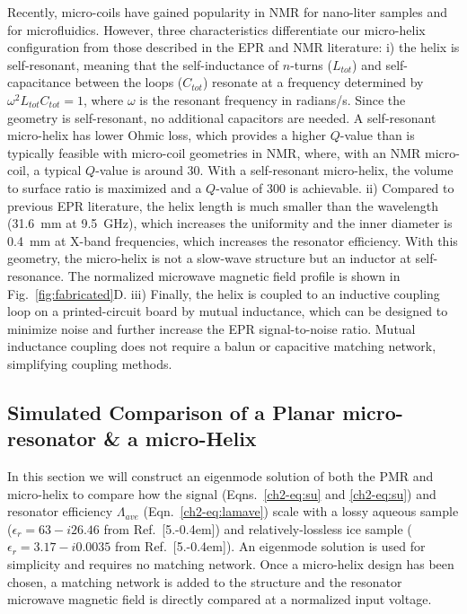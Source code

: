 Recently, micro-coils have gained popularity in NMR for nano-liter samples \cite{Olson1967, SUBRAMANIAN1998227, cr980140f,Kentgens2008,Raluca2011,Jones2012} and for microfluidics. \cite{Mompean2018} However, three characteristics differentiate our micro-helix configuration from those described in the EPR \cite{Webb1962, Helix1967, oldmicro} and NMR literature\cite{WEBB2005892}: i) the helix is self-resonant, meaning that the self-inductance of $n$-turns ($L_{tot}$) and self-capacitance between the loops ($C_{tot}$) resonate at a frequency determined by $\omega^2 L_{tot}C_{tot}=1$, where $\omega$ is the resonant frequency in radians/s. Since the geometry is self-resonant, no additional capacitors are needed. A self-resonant micro-helix has lower Ohmic loss, which provides a higher $Q$-value than is typically feasible with micro-coil geometries in NMR, where, with an NMR micro-coil, a typical $Q$-value is around 30. \cite{WEBB2005892} With a self-resonant micro-helix, the volume to surface ratio is maximized and a $Q$-value of 300 is achievable. ii) Compared to previous EPR literature, the helix length is much smaller than the wavelength (31.6~mm at 9.5~GHz), which increases the uniformity and the inner diameter is 0.4~mm at X-band frequencies, which increases the resonator efficiency. With this geometry, the micro-helix is not a slow-wave structure but an inductor at self-resonance. The normalized microwave magnetic field profile is shown in Fig.~\ref{fig:fabricated}D. iii) Finally, the helix is coupled to an inductive coupling loop on a printed-circuit board by mutual inductance, which can be designed to minimize noise and further increase the EPR signal-to-noise ratio. \cite{coupling2016} Mutual inductance coupling does not require a balun or capacitive matching network, simplifying coupling methods.

\subsection{Simulated Comparison of a Planar micro-resonator \& a micro-Helix} In this section we will construct an eigenmode solution of both the PMR and micro-helix to compare how the signal (Eqns.~\ref{ch2-eq:su} and \ref{ch2-eq:su}) and resonator efficiency $\Lambda_{ave}$ (Eqn.~\ref{ch2-eq:lamave}) scale with a lossy aqueous sample ($\epsilon_r = 63 - i26.46$ from Ref.~[5.\kern-0.4em]) and relatively-lossless ice sample ($\epsilon_r=3.17-i0.0035$ from Ref.~[5.\kern-0.4em]). An eigenmode solution is used for simplicity and requires no matching network. Once a micro-helix design has been chosen, a matching network is added to the structure and the resonator microwave magnetic field is directly compared at a normalized input voltage. 

